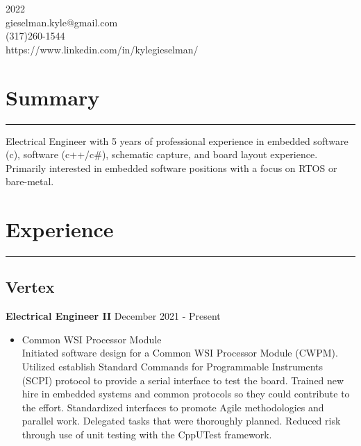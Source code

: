 \documentclass[10pt, letterpaper]{article}
\begin{document}
 \hfill 2022 \\
gieselman.kyle@gmail.com \\
(317)260-1544 \\
https://www.linkedin.com/in/kylegieselman/ \\
\vspace{-4ex}


\section*{Summary} \vspace{-2ex} \hrule
\vspace{1ex}

Electrical Engineer with 5 years of professional experience in embedded software
(c), software (c++/c\#), schematic capture, and board layout experience. Primarily interested in embedded software positions with a focus on RTOS or bare-metal.

\vspace{-2ex}
\section*{Experience} \vspace{-2ex} \hrule
\vspace{1ex}

\subsection*{Vertex}

\textbf{Electrical Engineer II} \hfill December 2021 - Present \\
\vspace{-4ex}
\begin{itemize}[noitemsep]
    \item Common WSI Processor Module \\
    Initiated software design for a Common WSI Processor Module (CWPM). Utilized establish Standard Commands for Programmable Instruments (SCPI) protocol to provide a serial interface to test the board. Trained new hire in embedded systems and common protocols so they could contribute to the effort. Standardized interfaces to promote Agile methodologies and parallel work. Delegated tasks that were thoroughly planned. Reduced risk through use of unit testing with the CppUTest framework.
\end{itemize}
\end{document}
